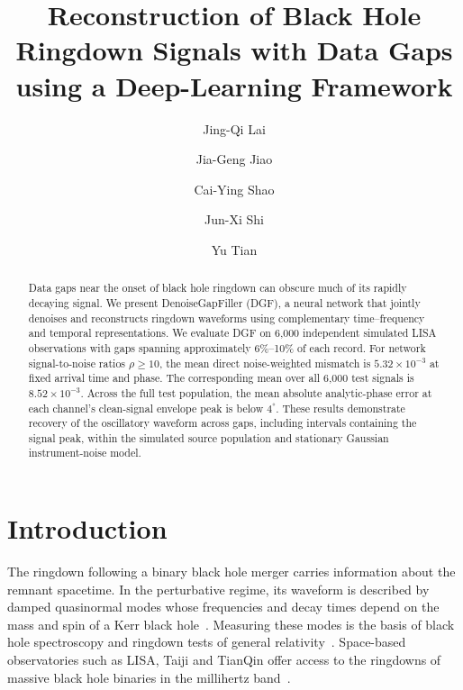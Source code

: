 \documentclass[10pt,prd,aps,a4paper,twocolumn,superscriptaddress,nofootinbib,floatfix]{revtex4-2}
\begin{document}
\title{Reconstruction of Black Hole Ringdown Signals with Data Gaps using a Deep-Learning Framework}
\author{Jing-Qi Lai}
\author{Jia-Geng Jiao}
\author{Cai-Ying Shao}

\author{Jun-Xi Shi}
\author{Yu Tian}

\begin{abstract}
Data gaps near the onset of black hole ringdown can obscure much of its rapidly decaying signal. We present DenoiseGapFiller (DGF), a neural network that jointly denoises and reconstructs ringdown waveforms using complementary time--frequency and temporal representations. We evaluate DGF on 6,000 independent simulated LISA observations with gaps spanning approximately 6\%--10\% of each record. For network signal-to-noise ratios $\rho\ge10$, the mean direct noise-weighted mismatch is $5.32\times10^{-3}$ at fixed arrival time and phase. The corresponding mean over all 6,000 test signals is $8.52\times10^{-3}$. Across the full test population, the mean absolute analytic-phase error at each channel's clean-signal envelope peak is below $4^\circ$. These results demonstrate recovery of the oscillatory waveform across gaps, including intervals containing the signal peak, within the simulated source population and stationary Gaussian instrument-noise model.
\end{abstract}

\maketitle
\section{Introduction}
The ringdown following a binary black hole merger carries information about the remnant spacetime. In the perturbative regime, its waveform is described by damped quasinormal modes whose frequencies and decay times depend on the mass and spin of a Kerr black hole~\cite{berti2006gravitational,berti2009qnm}. Measuring these modes is the basis of black hole spectroscopy and ringdown tests of general relativity~\cite{Isi_2019}. Space-based observatories such as LISA, Taiji and TianQin offer access to the ringdowns of massive black hole binaries in the millihertz band~\cite{amaroseoane2017laserinterferometerspaceantenna,robson2019construction,Ruan2020,Luo2016}.
\end{document}
